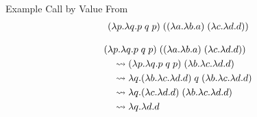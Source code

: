 \documentclass[10pt]{beamer}
\newcommand{\lam}[2]{\lambda #1 . #2}
\newcommand{\app}[2]{#1 \; #2}
\begin{document}
\begin{frame}
  \begin{exampleblock}{Example Call by Value}
    From \cite{SE101672}
    \begin{align*}
      \app{(\lam{p}{\lam{q}{\app{\app{p}{q}}{p}}})}{(\app{(\myt)}{(\myf)})}
    \end{align*}




    \begin{align*}
       & \app{(\lam{p}{\lam{q}{\app{\app{p}{q}}{p}}})}{(\app{(\myt)}{(\myf)})}  \\
       & \quad \rightsquigarrow \app{(\lam{p}{\lam{q}{\app{\app{p}{q}}{p}}})}{(
        \lam{b}{\myf}
      )}                                                                        \\
       & \quad \rightsquigarrow \lam{q}{
        \app{
          \app{(
            \lam{b}{\myf}
            )}{q}
      }{(\lam{b}{\myf})}}                                                       \\
       & \quad \rightsquigarrow \lam{q}{
        \app{
          (\myf)
      }{(\lam{b}{\myf})}}                                                       \\
       & \quad \rightsquigarrow \lam{q}{\lam{d}{d}}
    \end{align*}


  \end{exampleblock}

\end{frame}
\end{document}
